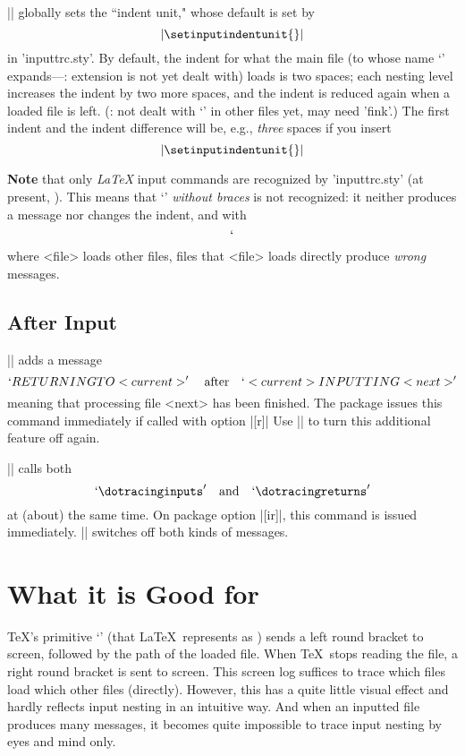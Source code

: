 \documentclass[fleqn]{article}%
\newcommand*{\TODO}{\textcolor{blue}{\acro{TODO}}}
\begin{document}
|| globally sets the ``indent unit,"
whose default is set by
\[|\setinputindentunit{\space\space}|\]
in 'inputtrc.sty'. By default, the indent for what the main file 
(to whose name `\jobname' expands---\TODO: extension is not 
 yet dealt with) loads is two spaces; each nesting level increases 
the indent by two more spaces, and the indent is reduced again when a 
loaded file is left. 
(\TODO: not dealt with `\dotracinginputs' in other files yet, 
 may need 'fink'.)
The first indent and the indent difference will be, e.g., \emph{three} 
spaces if you insert
\[|\setinputindentunit{\space\space\space}|\]

\textbf{Note} that only \emph{\LaTeX} input commands are recognized by 
'inputtrc.sty' (at present, \TODO). This means that `' 
\emph{without braces} is not recognized: it neither produces a message 
nor changes the indent, and with 
\[`\]
where <file> loads other files, files that <file> loads directly 
produce \emph{wrong} messages. 

\subsection{After Input}
|\dotracingreturns| adds a message 
\[`RETURNING TO <current>' \quad \mbox{after} \quad 
  `<current> INPUTTING <next>'\]
meaning that processing file <next> has been finished. 
The package issues this command immediately if called 
with option |[r]|
Use |\notracingreturns| to turn this additional 
feature off again.

|\dotracinginputsreturns| calls both 
\[`\dotracinginputs' \quad \mbox{and} \quad  `\dotracingreturns'\] 
at (about) the same time.
On package option |[ir]|, this command is issued immediately.
|\notracinginputsreturns| switches off both kinds of messages.


\section{What it is Good for}

\TeX's primitive `' (that \LaTeX\ represents as )
sends a left round bracket to screen, followed by the path of the 
loaded file. When \TeX\ stops reading the file, a right round bracket 
is sent to screen. This screen log suffices to trace which files load 
which other files (directly). However, this has a quite little visual 
effect and hardly reflects input nesting in an intuitive way. 
And when an inputted file produces many messages, it becomes quite 
impossible to trace input nesting by eyes and mind only. 
\end{document}
